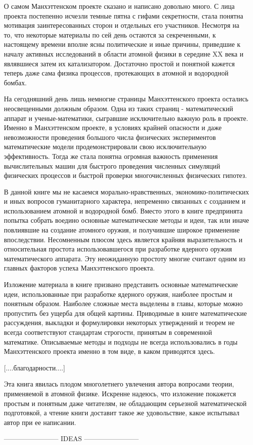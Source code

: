 О самом Манхэттенском проекте сказано и написано довольно много.
С лица проекта постепенно исчезли темные пятна с гифами секретности, стала понятна мотивация заинтересованных сторон и отдельных его участников.
Несмотря на то, что некоторые материалы по сей день остаются за секреченными, к настоящему времени вполне ясны политические и иные причины, приведшие к началу активных исследований в области атомной физики в середине XX века и являвшиеся затем их катализатором.
Достаточно простой и понятной кажется теперь даже сама физика процессов, протекающих в атомной и водородной бомбах.

На сегодняшний день лишь немногие страницы Манхэттенского проекта остались неосвещенными должным образом. 
Одна из таких страниц - математический аппарат и ученые-математики, сыгравшие исключительно важную роль в проекте.
Именно в Манхэттенском проекте, в условиях крайней опасности и даже невозможности проведения большого числа физических экспериментов математические модели продемонстрировали свою исключительную эффективность.
Тогда же стала понятна огромная важность применения вычислительных машин для быстрого проведения численных симуляций физических процессов и быстрой проверки многочисленных физических гипотез.

В данной книге мы не касаемся морально-нравственных, экономико-политических и иных вопросов гуманитарного характера, непременно связанных с созданием и использованием атомной и водородной бомб.
Вместо этого в книге предпринята попытка собрать воедино основные математические методы и идеи, так или иначе повлиявшие на создание атомного оружия, и получившие широкое применение впоследствии.
Несомненным плюсом здесь является крайняя выразительность и относительная простота использовавшегося при разработке ядерного оружия математического аппарата. 
Эту неожиданную простоту многие считают одним из главных факторов успеха Манхэттенского проекта.

Изложение материала в книге призвано представить основные математические идеи, использованные при разработке ядерного оружия, наиболее простым и понятным образом. 
Наиболее сложные места выделены в главы, которые можно пропустить без ущерба для общей картины.
Приводимые в книге математические рассуждения, выкладки и формулировки некоторых утверждений и теорем не всегда соответствуют стандартам строгости, принятым в современной математике.
Описываемые методы и подходы не всегда использовались в годы Манхэттенского проекта именно в том виде, в каком приводятся здесь.

[....благодарности....]

Эта книга явилась плодом многолетнего увлечения автора вопросами теории, применяемой в атомной физике. 
Искренне надеюсь, что изложение покажется простым и понятным даже читателям, не обладающим серьезной математической подготовкой, а чтение книги доставит такое же удовольствие, какое испытывал автор при ее написании.


------------------------ IDEAS ------------------------ 











